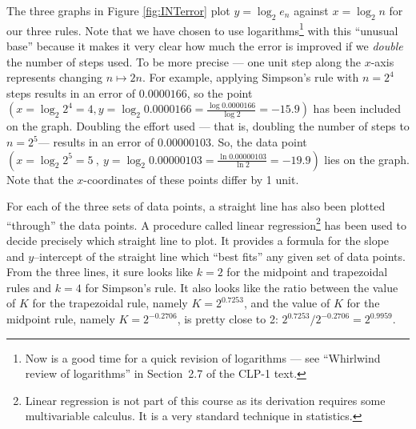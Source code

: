 The three graphs in Figure \ref{fig:INTerror} plot $y=\log_2 e_n$
against $x=\log_2 n$ for our three rules. Note that we have chosen to use
logarithms\footnote{Now is a good time for a quick revision of logarithms --- see
``Whirlwind review of logarithms'' in Section~2.7 of the CLP-1 text.} with
this ``unusual base'' because it makes it very clear how much the error is improved if we
\emph{double} the number of steps used. To be more precise --- one unit step along the
$x$-axis represents changing $n \mapsto 2n$. For example, applying Simpson's rule with
$n=2^4$ steps results in an error of $0.0000166$, so the point $(x=\log_2 2^4=4, y=\log_2
0.0000166 = \frac{\log 0.0000166}{\log 2} = -15.9)$ has been included on the graph. Doubling
the effort used --- that is, doubling the number of steps to $n=2^5$--- results in an
error of $0.00000103$. So, the data point $(x=\log_2 2^5=5\ ,\  y=\log_2 0.00000103
=\frac{\ln 0.00000103}{\ln 2}=-19.9)$ lies on the graph. Note that the $x$-coordinates of
these points differ by 1 unit.


For each of the three sets of data points, a straight line has also
been plotted ``through'' the data points. A procedure called linear
regression\footnote{Linear regression is not part of  this course as its derivation
requires some multivariable calculus. It is a very standard technique in statistics.} has
been used to decide precisely which straight line to plot.
It provides a formula for the slope and $y$--intercept of the straight
line which ``best fits'' any given set of data points. From the three lines,
it sure looks like $k=2$ for the midpoint and trapezoidal rules and
$k=4$ for Simpson's rule.
It also looks like the ratio between the value of $K$ for the trapezoidal rule,
namely $K=2^{0.7253}$, and the value of $K$ for the midpoint rule,
namely $K=2^{-0.2706}$, is pretty close to 2:  $2^{0.7253}/2^{-0.2706}=2^{0.9959}$.

